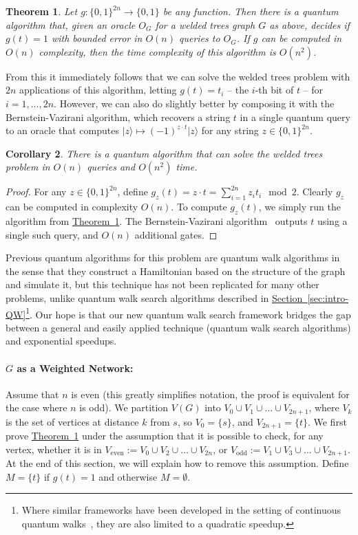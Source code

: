 \documentclass{article}
\newtheorem{theorem}{Theorem}\newtheorem{lemma}[theorem]{Lemma}\newtheorem{proposition}[theorem]{Proposition}\newtheorem{corollary}[theorem]{Corollary}\newtheorem{definition}[theorem]{Definition}\newtheorem{claim}[theorem]{Claim}\newtheorem{remark}[theorem]{Remark}\newenvironment{cfigure}[1][htbp]{\begin{figure}[#1]\centering}{\end{figure}}
\renewcommand{\sec}[1]{\hyperref[sec:#1]{Section~\ref*{sec:#1}}}
\newcommand{\thm}[1]{\hyperref[thm:#1]{Theorem~\ref*{thm:#1}}}
\def\ket#1{{\lvert}#1\rangle}
\renewcommand{\>}{\rangle}
\newcommand{\<}{\langle}
\renewcommand{\(}{\left(}
\renewcommand{\)}{\right)}
\begin{document}
\begin{theorem}\label{thm:welded}
Let $g:\{0,1\}^{2n}\rightarrow\{0,1\}$ be any function. Then there is a quantum algorithm that, given an oracle $O_G$ for a welded trees graph $G$ as above, decides if $g(t)=1$ with bounded error in $O(n)$ queries to $O_G$. If $g$ can be computed in $O(n)$ complexity, then the time complexity of this algorithm is ${O}(n^2)$. 
\end{theorem}



From this it immediately follows that we can solve the welded trees problem with $2n$ applications of this algorithm, letting $g(t)=t_i$ -- the $i$-th bit of $t$ -- for $i=1,\dots,2n$. However, we can also do slightly better by composing it with the Bernstein-Vazirani algorithm, which recovers a string $t$ in a single quantum query to an oracle that computes $\ket{z}\mapsto (-1)^{z\cdot t}\ket{z}$ for any string $z\in\{0,1\}^{2n}$.
\begin{corollary}
There is a quantum algorithm that can solve the welded trees problem in $O(n)$ queries and ${O}(n^2)$ time. 
\end{corollary}
\begin{proof}
For any $z\in\{0,1\}^{2n}$, define $g_z(t)=z\cdot t = \sum_{i=1}^{2n}z_it_i\mod 2$. Clearly $g_z$ can be computed in complexity $O(n)$. To compute $g_z(t)$, we simply run the algorithm from \thm{welded}. The Bernstein-Vazirani algorithm~\cite{bernstein1997BValg} outputs $t$ using a single such query, and $O(n)$ additional gates. 
\end{proof}

Previous quantum algorithms for this problem are quantum walk algorithms in the sense that they construct a Hamiltonian based on the structure of the graph and simulate it, but this technique has not been replicated for many other problems, unlike quantum walk search algorithms described in \sec{intro-QW}\footnote{Where similar frameworks have been developed in the setting of continuous quantum walks~\cite{apers2022quadratic}, they are also limited to a quadratic speedup.}. Our hope is that our new quantum walk search framework bridges the gap between a general and easily applied technique (quantum walk search algorithms) and exponential speedups. 



\paragraph{$G$ as a Weighted Network:} Assume that $n$ is even (this greatly simplifies notation, the proof is equivalent for the case where $n$ is odd). We partition $V(G)$ into $V_0\cup V_1\cup\dots\cup V_{2n+1}$, where $V_k$ is the set of vertices at distance $k$ from $s$, so $V_0=\{s\}$, and $V_{2n+1}=\{t\}$. We first prove \thm{welded} under the assumption that it is possible to check, for any vertex, whether it is in $V_{\mathrm{even}}:=V_0\cup V_2\cup\dots \cup V_{2n}$, or $V_{\mathrm{odd}}:=V_1\cup V_3\cup \dots\cup V_{2n+1}$. At the end of this section, we will explain how to remove this assumption. Define $M=\{t\}$ if $g(t)=1$ and otherwise $M=\emptyset$.
\end{document}
